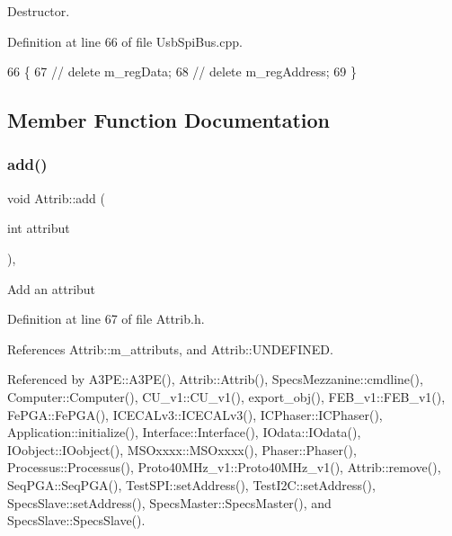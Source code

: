 Destructor. 



Definition at line 66 of file Usb\+Spi\+Bus.\+cpp.


\begin{DoxyCode}
66                       \{
67 \textcolor{comment}{//  delete m\_regData;}
68 \textcolor{comment}{//  delete m\_regAddress;}
69 \}
\end{DoxyCode}


\subsection{Member Function Documentation}
\mbox{\label{classAttrib_a235f773af19c900264a190b00a3b4ad7}} 
\subsubsection{\texorpdfstring{add()}{add()}}
{\footnotesize\ttfamily void Attrib\+::add (\begin{DoxyParamCaption}\item[{int}]{attribut }\end{DoxyParamCaption})\hspace{0.3cm}{\ttfamily [inline]}, {\ttfamily [inherited]}}

Add an attribut 

Definition at line 67 of file Attrib.\+h.



References Attrib\+::m\+\_\+attributs, and Attrib\+::\+U\+N\+D\+E\+F\+I\+N\+ED.



Referenced by A3\+P\+E\+::\+A3\+P\+E(), Attrib\+::\+Attrib(), Specs\+Mezzanine\+::cmdline(), Computer\+::\+Computer(), C\+U\+\_\+v1\+::\+C\+U\+\_\+v1(), export\+\_\+obj(), F\+E\+B\+\_\+v1\+::\+F\+E\+B\+\_\+v1(), Fe\+P\+G\+A\+::\+Fe\+P\+G\+A(), I\+C\+E\+C\+A\+Lv3\+::\+I\+C\+E\+C\+A\+Lv3(), I\+C\+Phaser\+::\+I\+C\+Phaser(), Application\+::initialize(), Interface\+::\+Interface(), I\+Odata\+::\+I\+Odata(), I\+Oobject\+::\+I\+Oobject(), M\+S\+Oxxxx\+::\+M\+S\+Oxxxx(), Phaser\+::\+Phaser(), Processus\+::\+Processus(), Proto40\+M\+Hz\+\_\+v1\+::\+Proto40\+M\+Hz\+\_\+v1(), Attrib\+::remove(), Seq\+P\+G\+A\+::\+Seq\+P\+G\+A(), Test\+S\+P\+I\+::set\+Address(), Test\+I2\+C\+::set\+Address(), Specs\+Slave\+::set\+Address(), Specs\+Master\+::\+Specs\+Master(), and Specs\+Slave\+::\+Specs\+Slave().


